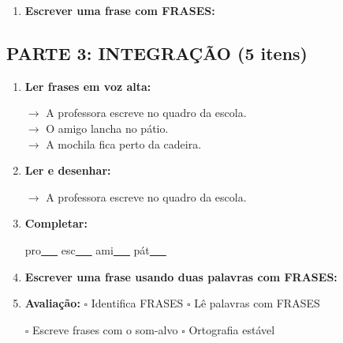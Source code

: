 \begin{exercicio}
\begin{enumerate}[resume]
  \item \textbf{Escrever uma frase com FRASES:}
  \begin{center}
  \underline{\hspace{12cm}}
  \end{center}

\end{enumerate}

\subsection*{PARTE 3: INTEGRAÇÃO (5 itens)}

\begin{enumerate}[resume]

  \item \textbf{Ler frases em voz alta:}
  \begin{center}
  $\rightarrow$ A professora escreve no quadro da escola.\\
  $\rightarrow$ O amigo lancha no pátio.\\
  $\rightarrow$ A mochila fica perto da cadeira.\\
  \end{center}

  \item \textbf{Ler e desenhar:}
  \begin{center}
  $\rightarrow$ A professora escreve no quadro da escola.
  \end{center}
  \begin{center}
  \end{center}

  \item \textbf{Completar:}
  \begin{center}
  pro\underline{~~~} \quad esc\underline{~~~} \quad ami\underline{~~~} \quad pát\underline{~~~}
  \end{center}

  \item \textbf{Escrever uma frase usando duas palavras com FRASES:}
  \begin{center}
  \underline{\hspace{12cm}}
  \end{center}

  \item \textbf{Avaliação:} $\square$ Identifica FRASES \quad $\square$ Lê palavras com FRASES
  \begin{center}
  $\square$ Escreve frases com o som-alvo \quad $\square$ Ortografia estável
  \end{center}


\end{enumerate}
\end{exercicio}
